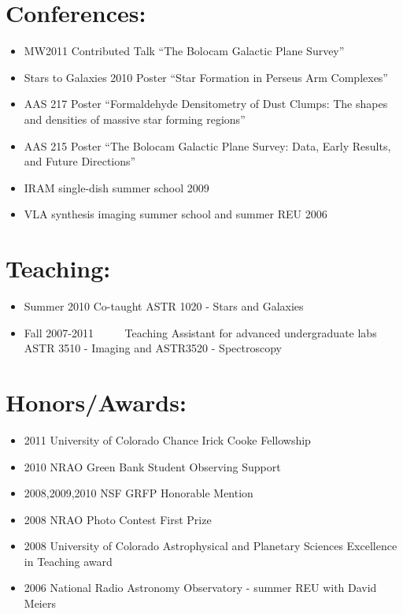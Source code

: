 \documentclass{article}
\begin{document}
\section*{Conferences: }
\begin{itemize}
    \item MW2011 Contributed Talk ``The Bolocam Galactic Plane Survey''
    \item Stars to Galaxies 2010 Poster ``Star Formation in Perseus Arm Complexes''
    \item AAS 217 Poster ``Formaldehyde Densitometry of Dust Clumps: The shapes and densities of massive star forming regions''
    \item AAS 215 Poster ``The Bolocam Galactic Plane Survey: Data, Early Results, and Future Directions''
    \item IRAM single-dish summer school 2009 
    \item VLA synthesis imaging summer school and summer REU 2006 
\end{itemize}


\section*{Teaching: }
\begin{itemize}
    \item Summer 2010         Co-taught ASTR 1020 - Stars and Galaxies
    \item Fall 2007-2011      Teaching Assistant for advanced undergraduate labs ASTR 3510 - Imaging and ASTR3520 - Spectroscopy
\end{itemize}

\section*{Honors/Awards: }
\begin{itemize}
    \item 2011 University of Colorado Chance Irick Cooke Fellowship
    \item 2010 NRAO Green Bank Student Observing Support 
    \item 2008,2009,2010 NSF GRFP Honorable Mention 
    \item 2008 NRAO Photo Contest First Prize 
    \item 2008 University of Colorado Astrophysical and Planetary Sciences Excellence in Teaching award 
    \item 2006 National Radio Astronomy Observatory - summer REU with David Meiers 
\end{itemize}

\newpage
\nocite{*}
\begin{footnotesize}

%

\end{footnotesize}
\end{document}
